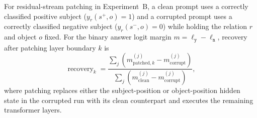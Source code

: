 \documentclass[11pt]{article}
\begin{document}
For residual-stream patching in Experiment~B, a clean prompt uses a correctly
classified positive subject ($y_r(s^+,o)=1$) and a corrupted prompt uses a
correctly classified negative subject ($y_r(s^-,o)=0$) while holding the
relation $r$ and object $o$ fixed. For the binary answer logit margin
$m=\ell_{\texttt{y}}-\ell_{\texttt{n}}$, recovery after patching layer boundary
$k$ is
\begin{equation}
  \operatorname{recovery}_k=
  \frac{\sum_j(m^{(j)}_{\mathrm{patched},k}-m^{(j)}_{\mathrm{corrupt}})}
       {\sum_j(m^{(j)}_{\mathrm{clean}}-m^{(j)}_{\mathrm{corrupt}})},
\end{equation}
where patching replaces either the subject-position or object-position hidden
state in the corrupted run with its clean counterpart and executes the remaining
transformer layers.


\end{document}
